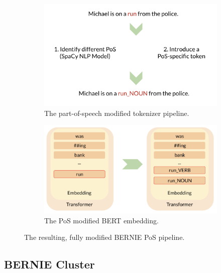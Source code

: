 \documentclass[a4paper,12pt,oneside,openright]{report}
\begin{document}
\begin{figure}
\begin{subfigure}{.52\textwidth}
  \centering
  \includegraphics[width=\linewidth]{./assets/experiments/pipeline_tokenizer_BERnie_POS_sentence.png}
  \caption{The part-of-speech modified tokenizer pipeline.}
  \label{fig:sfig1}
\end{subfigure}%
\hfill
\begin{subfigure}{.54\textwidth}
  \centering
  \includegraphics[width=\linewidth]{./assets/experiments/pipeline_model_BERnie_POS.png}
  \caption{The PoS modified BERT embedding.}
  \label{fig:sfig2}
\end{subfigure}
\caption{The resulting, fully modified BERNIE PoS pipeline.}
\label{fig:BERNIE_POS_full_pipeline}
\end{figure}

\subsection{BERNIE Cluster}\label{experiment_bernie_meaning}
\end{document}
